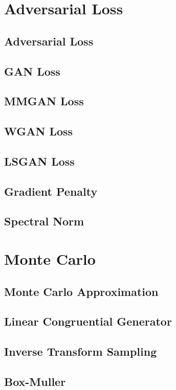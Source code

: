 \documentclass{article}
\begin{document}
\section{Adversarial Loss}
\subsection{Adversarial Loss}
\subsection{GAN Loss}
\subsection{MMGAN Loss}
\subsection{WGAN Loss}
\subsection{LSGAN Loss}
\subsection{Gradient Penalty}
\subsection{Spectral Norm}

\section{Monte Carlo}
\subsection{Monte Carlo Approximation}
\subsection{Linear Congruential Generator}
\subsection{Inverse Transform Sampling}
\subsection{Box-Muller}
\end{document}
